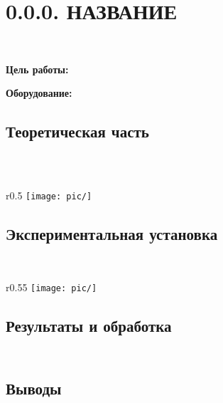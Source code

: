 \documentclass[12pt]{article}
\begin{document}
    \section*{0.0.0. НАЗВАНИЕ}
    \ \par
    \textbf{Цель работы:} \par
    \textbf{Оборудование:}

    \subsection*{Теоретическая часть}
    \ \par

    \begin{equation*}

    \end{equation*}

    \begin{wrapfigure}[9]{r}{0.5\linewidth}
        \label{fig:fig1}
        \centering
        \texttt{[image: pic/]}
        \caption{}
    \end{wrapfigure}

    \subsection*{Экспериментальная установка}
    \ \par
    \begin{wrapfigure}[12]{r}{0.55\linewidth}
        \label{fig:fig2}
        \centering
        \texttt{[image: pic/]}
        \caption{}
    \end{wrapfigure}

    \subsection*{Результаты и обработка}
    \begin{table}[h]
        \centering
        \caption{}
        \label{tab:tab1}
        \begin{tabular}{|p{0.5cm}|p{3cm}|p{4cm}|p{4cm}|}
            \hline
        \end{tabular}
    \end{table}

    \subsection*{Выводы}
\end{document}
